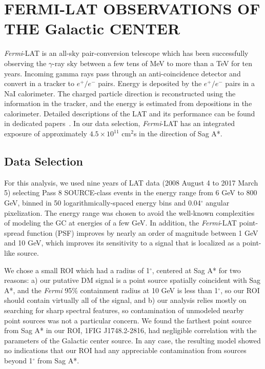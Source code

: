 \section{FERMI-LAT OBSERVATIONS OF THE Galactic CENTER}\label{sec:GC}

{\it Fermi}-LAT is an all-sky pair-conversion telescope which has been successfully observing the $\gamma$-ray sky between a few tens of MeV to more than a TeV for ten years.
Incoming gamma rays pass through an anti-coincidence detector and convert in a tracker to $e^{+}/e^{-}$ pairs. 
Energy is deposited by the $e^{+}/e^{-}$ pairs in a NaI calorimeter.
The charged particle direction is reconstructed using the information in the tracker, and the energy is estimated from depositions in the calorimeter.  
Detailed descriptions of the LAT and its performance can be found in dedicated papers~\cite{Atwood:2009ez,2013arXiv1303.3514A}. 
In our data selection, {\it Fermi}-LAT has an integrated exposure of approximately $4.5 \times 10^{11}$ cm$^2$s in the direction of Sag A*.

\subsection{Data Selection}\label{sec:fermi}

For this analysis, we used nine years of LAT data (2008 August 4 to 2017 March 5) selecting {Pass 8} SOURCE-class events 
in the energy range from 6 GeV to 800 GeV, binned in 50 logarithmically-spaced energy bins and 0.04$^\circ$ angular pixelization. 
The energy range was chosen to avoid the well-known \cite[e.g.][]{GC2016} complexities of modeling the GC at energies of a few GeV. In addition,
the {\it Fermi}-LAT point-spread function (PSF) improves by nearly an order of magnitude between 1 GeV and 10 GeV, which improves its sensitivity to a signal that is localized as a point-like source.

We chose a small ROI which had a radius of 1$^\circ$, centered at Sag A* for two reasons: a) our putative DM signal is a point source spatially coincident with Sag A*, and the {\it Fermi} 95\% containment radius at 10 GeV is less than 1$^\circ$, so our ROI should contain virtually all of the signal, and b) our analysis relies mostly on searching for sharp spectral features, so contamination of unmodeled nearby point sources was not a particular concern.
We found the farthest point source from Sag A* in our ROI, 1FIG J1748.2-2816, had negligible correlation with the parameters of the Galactic center source.
In any case, the resulting model showed no indications that our ROI had any appreciable contamination from sources beyond 1$^\circ$ from Sag A*.

